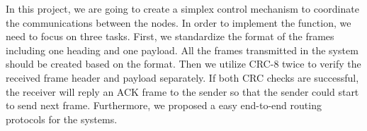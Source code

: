 In this project, we are going to create a simplex control mechanism to coordinate the communications between the nodes. In order to implement the function, we need to focus on three tasks.  First, we standardize the format of the frames including one heading and one payload. All the frames transmitted in the system should be created based on the format. Then we utilize CRC-8 twice to verify the received frame header and payload separately. If both CRC checks are successful, the receiver will reply an ACK frame to the sender so that the sender could start to send next frame. Furthermore, we proposed a easy end-to-end routing protocols for the systems. 

